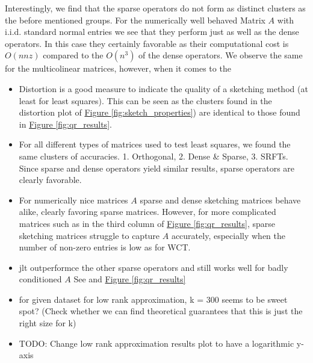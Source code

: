 \documentclass{article}
\begin{document}
Interestingly, we find that the sparse operators do not form as distinct clusters as the before mentioned groups. For the numerically well behaved Matrix $A$ with i.i.d. standard normal entries we see that they perform just as well as the dense operators. In this case they certainly favorable as their computational cost is $O(nnz)$ compared to the $O(n^3)$ of the dense operators. We observe the same for the multicolinear matrices, however, when it comes to the 
\begin{itemize}

    \item  Distortion is a good measure to indicate the quality of a sketching method (at least for least squares). This can be seen as the clusters found in the distortion plot of \hyperref[fig:sketch_properties]{Figure \ref*{fig:sketch_properties}}) are identical to those found in \hyperref[fig:qr_results]{Figure \ref*{fig:qr_results}}.
    \item For all different types of matrices used to test least squares, we found the same clusters of accuracies. 1. Orthogonal, 2. Dense \& Sparse, 3. SRFTs. Since sparse and dense operators yield similar results, sparse operators are clearly favorable.
    \item For numerically nice matrices $A$ sparse and dense sketching matrices behave alike, clearly favoring sparse matrices. However, for more complicated matrices such as in the third column of \hyperref[fig:qr_results]{Figure \ref*{fig:qr_results}}, sparse sketching matrices struggle to capture $A$ accurately, especially when the number of non-zero entries is low as for WCT. 
    \item jlt outperformce the other sparse operators and still works well for badly conditioned $A$ See  and \hyperref[fig:qr_results]{Figure \ref*{fig:qr_results}}
    \item for given dataset for low rank approximation, k = 300 seems to be sweet spot? (Check whether we can find theoretical guarantees that this is just the right size for k)
    \item TODO: Change low rank approximation results plot to have a logarithmic y-axis
    
\end{itemize}
\printbibliography
\end{document}
